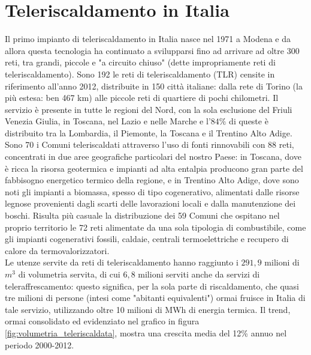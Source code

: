 \documentclass[laurea,oneside,11pt]{USiena_tesiLM}
\begin{document}
\section{Teleriscaldamento in Italia}
Il primo impianto di teleriscaldamento in Italia nasce nel 1971 a Modena e da allora questa tecnologia ha continuato a svilupparsi fino ad arrivare ad oltre 300 reti, tra grandi, piccole e "a circuito chiuso" (dette impropriamente reti di teleriscaldamento). Sono 192 le reti di teleriscaldamento (TLR) censite in riferimento all'anno 2012, distribuite in 150 città italiane: dalla rete di Torino (la più estesa: ben 467 km) alle piccole reti di quartiere di pochi chilometri.
Il servizio è presente in tutte le regioni del Nord, con la sola esclusione del Friuli Venezia Giulia, in Toscana, nel Lazio e nelle Marche e l'$84\%$ di queste è distribuito tra la Lombardia, il Piemonte, la Toscana e il Trentino Alto Adige.\\

Sono 70 i Comuni teleriscaldati attraverso l'uso di fonti rinnovabili con 88 reti, concentrati in due aree geografiche particolari del nostro Paese: in Toscana, dove è ricca la risorsa geotermica e impianti ad alta entalpia producono gran parte del fabbisogno energetico termico della regione, e in Trentino Alto Adige, dove sono noti gli impianti a biomassa, spesso di tipo cogenerativo, alimentati dalle risorse legnose provenienti dagli scarti delle lavorazioni locali e dalla manutenzione dei boschi.
Risulta più casuale  la distribuzione dei 59 Comuni che ospitano nel proprio territorio le 72 reti alimentate da una sola tipologia di combustibile, come gli impianti cogenerativi fossili, caldaie, centrali termoelettriche e recupero di calore da termovalorizzatori. \\

Le utenze servite da reti di teleriscaldamento hanno raggiunto i $291,9$ milioni di $m^3$ di volumetria servita, di cui $6,8$ milioni serviti anche da servizi di teleraffrescamento: questo significa, per la sola parte di riscaldamento, che quasi tre milioni di persone (intesi come "abitanti equivalenti") ormai fruisce in Italia di tale servizio, utilizzando oltre 10 milioni di MWh di energia termica.
Il trend, ormai consolidato ed evidenziato nel grafico in figura \ref{fig:volumetria_teleriscaldata}, mostra una crescita media del 12\% annuo nel periodo 2000-2012. 
\end{document}
